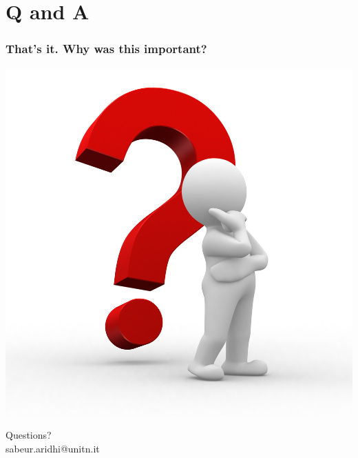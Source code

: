 \section{Q and A}
\begin{frame}
 \frametitle{That's it. Why was this important?}
 \begin{center}
 
 \includegraphics[keepaspectratio=true,scale=0.45]{figs/12/questions}

\footnotesize Questions?\\
sabeur.aridhi@unitn.it
 \end{center}
\end{frame}


